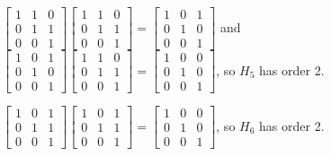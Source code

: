 \documentclass[12pt,letterpaper]{article}
\begin{document}
\begin{enumerate}
\begin{enumerate}
          $
            \begin{bmatrix}
              1 & 1 & 0 \\
              0 & 1 & 1 \\
              0 & 0 & 1
            \end{bmatrix}
            \begin{bmatrix}
              1 & 1 & 0 \\
              0 & 1 & 1 \\
              0 & 0 & 1
            \end{bmatrix}
            =
            \begin{bmatrix}
              1 & 0 & 1 \\
              0 & 1 & 0 \\
              0 & 0 & 1
            \end{bmatrix}
          $ and
          $
            \begin{bmatrix}
              1 & 0 & 1 \\
              0 & 1 & 0 \\
              0 & 0 & 1
            \end{bmatrix}
            \begin{bmatrix}
              1 & 1 & 0 \\
              0 & 1 & 1 \\
              0 & 0 & 1
            \end{bmatrix}
            =
            \begin{bmatrix}
              1 & 0 & 0 \\
              0 & 1 & 0 \\
              0 & 0 & 1
            \end{bmatrix}
          $, so $H_5$ has order 2.

          $
            \begin{bmatrix}
              1 & 0 & 1 \\
              0 & 1 & 1 \\
              0 & 0 & 1
            \end{bmatrix}
            \begin{bmatrix}
              1 & 0 & 1 \\
              0 & 1 & 1 \\
              0 & 0 & 1
            \end{bmatrix}
            =
            \begin{bmatrix}
              1 & 0 & 0 \\
              0 & 1 & 0 \\
              0 & 0 & 1
            \end{bmatrix}
          $, so $H_6$ has order 2.


\end{enumerate}
\end{enumerate}
\end{document}
